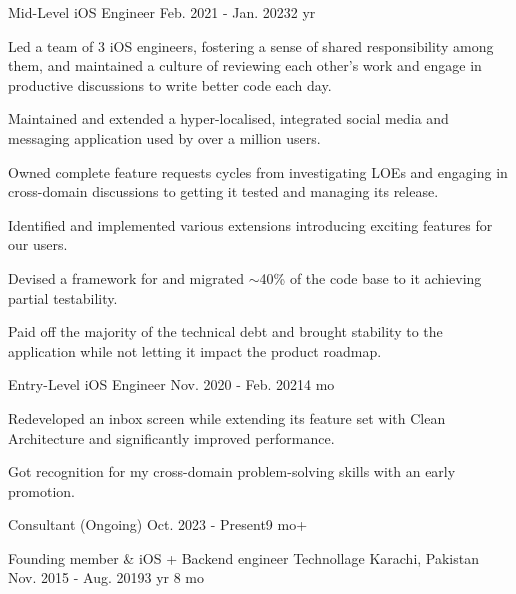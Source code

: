 \begin{cventries}
  \cventry
  {Mid-Level iOS Engineer} %
  {} %
  {} %
  {Feb. 2021 - Jan. 2023{\enskip\cdotp\enskip}2 yr} %
  {
    \begin{cvitems} %
      \item {Led a team of 3 iOS engineers, fostering a sense of shared responsibility among them, and maintained a culture of reviewing each other's work and engage in productive discussions to write better code each day.}
      \item {Maintained and extended a hyper-localised, integrated social media and messaging application used by over a million users.}
      \item {Owned complete feature requests cycles from investigating LOEs and engaging in cross-domain discussions to getting it tested and managing its release.}
      \item {Identified and implemented various  extensions introducing exciting features for our users.}
      \item {Devised a framework for  and migrated $\sim$40\% of the code base to it achieving partial testability.}
      \item {Paid off the majority of the technical debt and brought stability to the application while not letting it impact the product roadmap.}
    \end{cvitems}
  }

  \cventry
  {Entry-Level iOS Engineer} %
  {} %
  {} %
  {Nov. 2020 - Feb. 2021{\enskip\cdotp\enskip}4 mo} %
  {
    \begin{cvitems} %
      \item {Redeveloped an inbox screen while extending its feature set with Clean Architecture and significantly improved performance.}
      \item {Got recognition for my cross-domain problem-solving skills with an early promotion.}
    \end{cvitems}
  }

  \cventry
  {Consultant (Ongoing)} %
  {}
  {}
  {Oct. 2023 - Present{\enskip\cdotp\enskip}9 mo+} %
  {
  }

  \cventry
  {Founding member \& iOS + Backend engineer} %
  {Technollage} %
  {Karachi, Pakistan} %
  {Nov. 2015 - Aug. 2019{\enskip\cdotp\enskip}3 yr 8 mo} %
  {
  }

\end{cventries}
